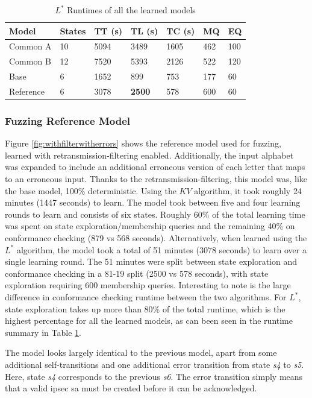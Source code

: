 \begin{table}[h]
	\centering
	\begin{tabular}{|l|l|l|l|l|l|l|}
		\hline
		\rowcolor[HTML]{C0C0C0} 
		Model     & States & TT (s)   & TL (s)   & TC (s)   & MQ  & EQ  \\ \hline
		Common A  & 10     & 5094 & 3489 & 1605 & 462 & 100 \\ \hline
		Common B  & 12     & 7520 & 5393 & 2126 & 522 & 120 \\ \hline
		Base      & 6      & 1652 & 899  & 753  & 177 & 60  \\ \hline
		Reference & 6      & 3078 & \textbf{2500} & 578  & 600 & 60  \\ \hline
	\end{tabular}
	\caption{$L^*$ Runtimes of all the learned models}
	\label{tab:runtime_summary_lstar}
\end{table}
\newpage

\subsubsection*{Fuzzing Reference Model}
Figure \ref{fig:withfilterwitherrors} shows the reference model used for fuzzing, learned with retransmission-filtering enabled. Additionally, the input alphabet was expanded to include an additional erroneous version of each letter that maps to an erroneous input. Thanks to the retransmission-filtering, this model was, like the base model, 100\% deterministic. Using the $KV$ algorithm, it took roughly 24 minutes (1447 seconds) to learn. The model took between five and four learning rounds to learn and consists of six states. Roughly 60\% of the total learning time was spent on state exploration/membership queries and the remaining 40\% on conformance checking (879 vs 568 seconds). Alternatively, when learned using the $L^*$ algorithm, the model took a total of 51 minutes (3078 seconds) to learn over a single learning round. The 51 minutes were split between state exploration and conformance checking in a 81-19 split (2500 vs 578 seconds), with state exploration requiring 600 membership queries. Interesting to note is the large difference in conformance checking runtime between the two algorithms. For $L^*$, state exploration takes up more than 80\% of the total runtime, which is the highest percentage for all the learned models, as can been seen in the runtime summary in Table \ref{tab:runtime_summary_lstar}.

The model looks largely identical to the previous model, apart from some additional self-transitions and one additional error transition from state \emph{s4} to \emph{s5}. Here, state \emph{s4} corresponds to the previous \emph{s6}. The error transition simply means that a valid \ac{ipsec} \ac{sa} must be created before it can be acknowledged.

